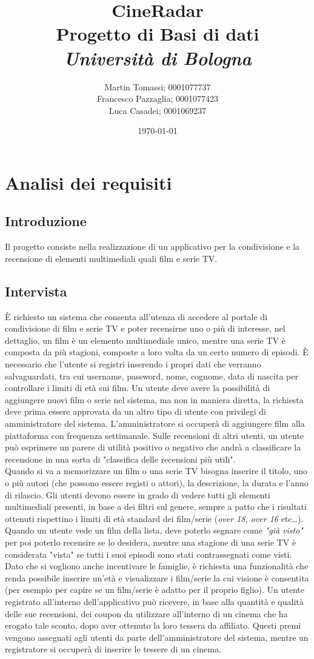 \documentclass[a4paper,12pt]{report}
\title{\textbf{CineRadar}\\Progetto di Basi di dati\\\textit{Università di Bologna}}
\author{Martin Tomassi; 0001077737\\Francesco Pazzaglia; 0001077423\\Luca Casadei; 0001069237}
\date{\today}
\begin{document}
\maketitle
\tableofcontents
\chapter{Analisi dei requisiti}
\section{Introduzione}
Il progetto consiste nella realizzazione di un applicativo per la condivisione e la recensione di elementi multimediali quali film e serie TV.
\section{Intervista}
È richiesto un sistema che consenta all'utenza di accedere al portale di condivisione di film e serie TV e poter recensirne uno o più di interesse, nel dettaglio, un film è un elemento multimediale unico, mentre una serie TV è composta da più stagioni, composte a loro volta da un certo numero di episodi. È necessario che l'utente si registri inserendo i propri dati che verranno salvaguardati, tra cui username, password, nome, cognome, data di nascita per controllare i limiti di età sui film. Un utente deve avere la possibilità di aggiungere nuovi film o serie nel sistema, ma non in maniera diretta, la richiesta deve prima essere approvata da un altro tipo di utente con privilegi di amministratore del sistema. L'amministratore si occuperà di aggiungere film alla piattaforma con frequenza settimanale. Sulle recensioni di altri utenti, un utente può esprimere un parere di utilità positivo o negativo che andrà a classificare la recensione in una sorta di "classifica delle recensioni più utili".
\\
Quando si va a memorizzare un film o una serie TV bisogna inserire il titolo, uno o più autori (che possono essere registi o attori), la descrizione, la durata e l'anno di rilascio. Gli utenti devono essere in grado di vedere tutti gli elementi multimediali presenti, in base a dei filtri sul genere, sempre a patto che i risultati ottenuti rispettino i limiti di età standard dei film/serie (\textit{over 18, over 16} etc\dots). Quando un utente vede un film della lista, deve poterlo segnare come \textit{"già visto"} per poi poterlo recensire se lo desidera, mentre una stagione di una serie TV è considerata "vista" se tutti i suoi episodi sono stati contrassegnati come visti. Dato che si vogliono anche incentivare le famiglie, è richiesta una funzionalità che renda possibile inserire un'età e visualizzare i film/serie la cui visione è consentita (per esempio per capire se un film/serie è adatto per il proprio figlio). Un utente registrato all'interno dell'applicativo può ricevere, in base alla quantità e qualità delle sue recensioni, dei coupon da utilizzare all'interno di un cinema che ha erogato tale sconto, dopo aver ottenuto la loro tessera da affiliato. Questi premi vengono assegnati agli utenti da parte dell'amministratore del sistema, mentre un registratore si occuperà di inserire le tessere di un cinema.\\ 
\end{document}
